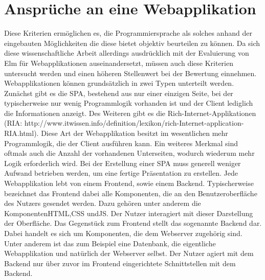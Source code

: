 \section{Ansprüche an eine Webapplikation}
\label{sec:ansprueche-webapp}
Diese Kriterien ermöglichen es, die Programmiersprache als solches anhand der eingebauten Möglichkeiten die diese bietet objektiv beurteilen zu können. Da sich diese wissenschaftliche Arbeit allerdings ausdrücklich mit der Evaluierung von Elm für Webapplikationen auseinandersetzt, müssen auch diese Kriterien untersucht werden und einen höheren Stellenwert bei der Bewertung einnehmen.
Webapplikationen können grundsätzlich in zwei Typen unterteilt werden. Zunächst gibt es die  \ac{SPA}, bestehend aus nur einer einzigen Seite, bei der typischerweise nur wenig  Programmlogik vorhanden ist und der Client lediglich die Informationen anzeigt. Des Weiteren gibt es die Rich-Internet-Applikationen\\
(RIA: http://www.itwissen.info/definition/lexikon/rich-Internet-application-RIA.html). Diese Art der Webapplikation besitzt im wesentlichen mehr Programmlogik, die der Client ausführen kann. Ein weiteres Merkmal sind oftmals auch die Anzahl der vorhandenen Unterseiten, wodurch wiederum mehr Logik erforderlich wird.
Bei der Erstellung einer \ac{SPA} muss generell weniger Aufwand betrieben werden, um eine fertige Präsentation zu erstellen.
Jede Webapplikation lebt von einem Frontend, sowie einem Backend. Typischerweise bezeichnet das Frontend dabei alle Komponenten, die an den Benutzeroberfläche des Nutzers gesendet werden. Dazu gehören unter anderem die Komponenten\ac{HTML},\ac{CSS} und\ac{JS}. Der Nutzer interagiert mit dieser Darstellung der Oberfläche.
Das Gegenstück zum Frontend stellt das sogenannte Backend dar. Dabei handelt es sich um Komponenten, die dem Webserver zugehörig sind. Unter anderem ist das zum Beispiel eine Datenbank, die eigentliche Webapplikation und natürlich der Webserver selbst. Der Nutzer agiert mit dem Backend nur über zuvor im Frontend eingerichtete Schnittstellen mit dem Backend.


